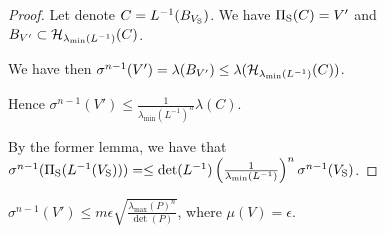 \begin{proof}
Let denote $C= L^{-1}(B_{V_{\text{S}}})$. We have $\Pi_{\text{S}}(C) = V'$ and $B_{V'} \subset \mathcal{H}_{\lambda_{\min}(L^{-1})}(C)$. 

We have then $\sigma^{n-1}(V') = \lambda(B_{V'}) \leq \lambda (\mathcal{H}_{\lambda_{\min}(L^{-1})}(C))$.

Hence $\sigma^{n-1}(V') \leq \frac{1}{\lambda_{\min}(L^{-1})^n} \lambda(C)$.

By the former lemma, we have that $ \sigma^{n-1}(\Pi_{\text{S}}(L^{-1}(V_{\text{S}}))) = \leq \det(L^{-1}) \left(\frac{1}{\lambda_{\min}(L^{-1})}\right)^n \sigma^{n-1}(V_{\text{S}})$.





\end{proof}

\begin{corollary}$\sigma^{n-1}(V') \leq m\epsilon \sqrt{\frac{\lambda_{\max}(P)^n}{\det(P)}}$,
where $\mu(V) = \epsilon$.
\end{corollary}


